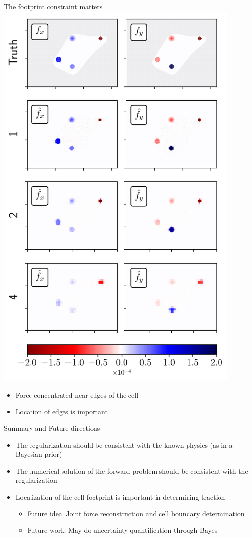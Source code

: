\documentclass[presentation]{beamer}
\begin{document}
\begin{frame}{The footprint constraint matters}
\centering
\includegraphics[width=0.9\textwidth]{figures/fig4}
\begin{itemize}
\item Force concentrated near edges of the cell
\item Location of edges is important
\end{itemize}
\end{frame}

\begin{frame}{Summary and Future directions}
\begin{itemize}
\item The regularization should be consistent with the known physics (as in a Bayesian prior)
\item The numerical solution of the forward problem should be consistent with the regularization
\item Localization of the cell footprint is important in determining traction
\begin{itemize}
\item Future idea: Joint force reconstruction and cell boundary determination
\item Future work: May do uncertainty quantification through Bayes
\end{itemize}
\end{itemize}
\end{frame}
\end{document}
